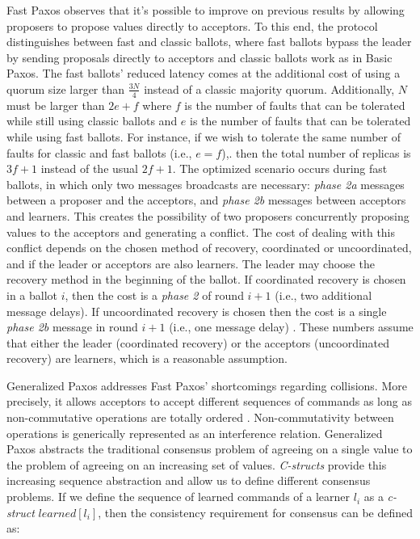 \documentclass[runningheads,a4paper]{llncs}
\begin{document}
Fast Paxos observes that it's possible to improve on previous results by allowing proposers to propose values directly to acceptors. To this end, the protocol distinguishes between fast and classic ballots, where fast ballots bypass the leader by sending proposals directly to acceptors and classic ballots work as in Basic Paxos. The fast ballots' reduced latency comes at the additional cost of using a quorum size larger than $\frac{3N}{4}$ instead of a classic majority quorum. Additionally, $N$ must be larger than $2e+f$  where $f$ is the number of faults that can be tolerated while still using classic ballots and $e$ is the number of faults that can be tolerated while using fast ballots. For instance, if we wish to tolerate the same number of faults for classic and fast ballots (i.e., $e=f$),. then the total number of replicas is $3f+1$ instead of the usual $2f+1$. The optimized scenario occurs during fast ballots, in which only two messages broadcasts are necessary: \textit{phase 2a} messages between a proposer and the acceptors, and \textit{phase 2b} messages between acceptors and learners. This creates the possibility of two proposers concurrently proposing values to the acceptors and generating a conflict. The cost of dealing with this conflict depends on the chosen method of recovery, coordinated or uncoordinated, and if the leader or acceptors are also learners. The leader may choose  the recovery method in the beginning of the ballot. If coordinated recovery is chosen in a ballot $i$, then the cost is a \textit{phase 2} of round $i+1$ (i.e., two additional message delays). If uncoordinated recovery is chosen then the cost is a single \textit{phase 2b} message in round $i+1$ (i.e., one message delay) \cite{Lamport2006}. These numbers assume that either the leader (coordinated recovery) or the acceptors (uncoordinated recovery) are learners, which is a reasonable assumption. \par
Generalized Paxos addresses Fast Paxos' shortcomings regarding collisions. More precisely, it allows acceptors to accept different sequences of commands as long as non-commutative operations are totally ordered \cite{Lamport2005}.  Non-commutativity between operations is generically represented as an interference relation. Generalized Paxos abstracts the traditional consensus problem of agreeing on a single value to the problem of agreeing on an increasing set of values. \textit{C-structs} provide this increasing sequence abstraction and allow us to define different consensus problems. If we define the sequence of learned commands of a learner $l_i$ as a \textit{c-struct} $learned[l_i]$, then the consistency requirement for consensus can be defined as:\par
\end{document}
